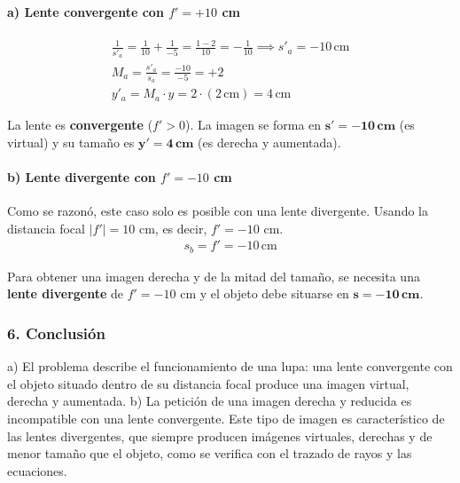 \paragraph*{a) Lente convergente con $f'=+10$ cm}
\begin{gather}
    \frac{1}{s'_a} = \frac{1}{10} + \frac{1}{-5} = \frac{1-2}{10} = -\frac{1}{10} \implies s'_a = -10 \, \text{cm} \\
    M_a = \frac{s'_a}{s_a} = \frac{-10}{-5} = +2 \\
    y'_a = M_a \cdot y = 2 \cdot (2 \, \text{cm}) = 4 \, \text{cm}
\end{gather}
\begin{cajaresultado}
    La lente es \textbf{convergente} ($f'>0$). La imagen se forma en $\boldsymbol{s'=-10 \, cm}$ (es virtual) y su tamaño es $\boldsymbol{y'=4 \, cm}$ (es derecha y aumentada).
\end{cajaresultado}

\paragraph*{b) Lente divergente con $f'=-10$ cm}
Como se razonó, este caso solo es posible con una lente divergente. Usando la distancia focal $|f'|=10$ cm, es decir, $f'=-10$ cm.
\begin{gather}
    s_b = f' = -10 \, \text{cm}
\end{gather}
\begin{cajaresultado}
    Para obtener una imagen derecha y de la mitad del tamaño, se necesita una \textbf{lente divergente} de $f'=-10$ cm y el objeto debe situarse en $\boldsymbol{s = -10 \, cm}$.
\end{cajaresultado}

\subsubsection*{6. Conclusión}
\begin{cajaconclusion}
a) El problema describe el funcionamiento de una lupa: una lente convergente con el objeto situado dentro de su distancia focal produce una imagen virtual, derecha y aumentada. b) La petición de una imagen derecha y reducida es incompatible con una lente convergente. Este tipo de imagen es característico de las lentes divergentes, que siempre producen imágenes virtuales, derechas y de menor tamaño que el objeto, como se verifica con el trazado de rayos y las ecuaciones.
\end{cajaconclusion}

